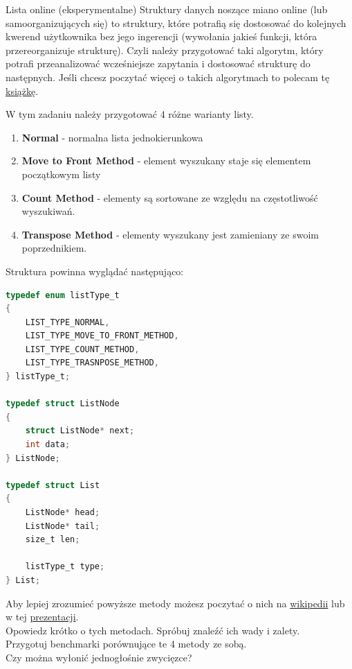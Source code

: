 \begin{exercise}{Lista online (eksperymentalne)}{}
Struktury danych noszące miano online (lub samoorganizujących się) to struktury, które potrafią się dostosować do kolejnych kwerend użytkownika bez jego ingerencji (wywołania jakieś funkcji, która przereorganizuje strukturę). Czyli należy przygotować taki algorytm, który potrafi przeanalizować wcześniejsze zapytania i dostosować strukturę do następnych. Jeśli chcesz poczytać więcej o takich algorytmach to polecam tę \href{https://link.springer.com/chapter/10.1007/BFb0029563}{książkę}.

W tym zadaniu należy przygotować 4 różne warianty listy.
\begin{enumerate}
    \item \textbf{Normal} - normalna lista jednokierunkowa
    \item \textbf{Move to Front Method} - element wyszukany staje się elementem początkowym listy
    \item \textbf{Count Method} - elementy są sortowane ze względu na częstotliwość wyszukiwań.
    \item \textbf{Transpose Method} - elementy wyszukany jest zamieniany ze swoim poprzednikiem.
\end{enumerate}

Struktura powinna wyglądać następująco:
\begin{lstlisting}[language=C,style=C99]
typedef enum listType_t
{
    LIST_TYPE_NORMAL,
    LIST_TYPE_MOVE_TO_FRONT_METHOD,
    LIST_TYPE_COUNT_METHOD,
    LIST_TYPE_TRASNPOSE_METHOD,
} listType_t;

typedef struct ListNode
{
    struct ListNode* next;
    int data;
} ListNode;

typedef struct List
{
    ListNode* head;
    ListNode* tail;
    size_t len;
    
    listType_t type;
} List;
\end{lstlisting}

Aby lepiej zrozumieć powyższe metody możesz poczytać o nich na \href{https://en.wikipedia.org/wiki/Self-organizing_list}{wikipedii} lub w tej \href{https://www.eecs.yorku.ca/course_archive/2003-04/F/2011/2011A/DatStr_071_SOLists.pdf}{prezentacji}. \\

Opowiedz krótko o tych metodach. Spróbuj znaleźć ich wady i zalety. \\
Przygotuj benchmarki porównujące te 4 metody ze sobą. \\

Czy można wyłonić jednogłośnie zwycięzce?
\end{exercise}


